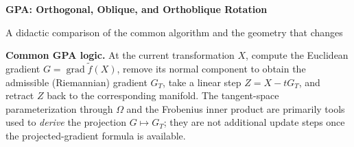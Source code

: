 \documentclass[10pt,a4paper]{article}
\newcommand{\grad}{\operatorname{grad}}
\begin{document}
{\LARGE\bfseries GPA: Orthogonal, Oblique, and Orthoblique Rotation}\par
\vspace{2mm}
{\large A didactic comparison of the common algorithm and the geometry that changes}\par
\vspace{4mm}

\colorbox{subhead}{\parbox{0.985\textwidth}{
\textbf{Common GPA logic.} At the current transformation $X$, compute the Euclidean gradient $G=\grad\tilde f(X)$, remove its normal component to obtain the admissible (Riemannian) gradient $G_T$, take a linear step $Z=X-tG_T$, and retract $Z$ back to the corresponding manifold. The tangent-space parameterization through $\Omega$ and the Frobenius inner product are primarily tools used to \emph{derive} the projection $G\mapsto G_T$; they are not additional update steps once the projected-gradient formula is available.
}}

\vspace{5mm}
\end{document}

